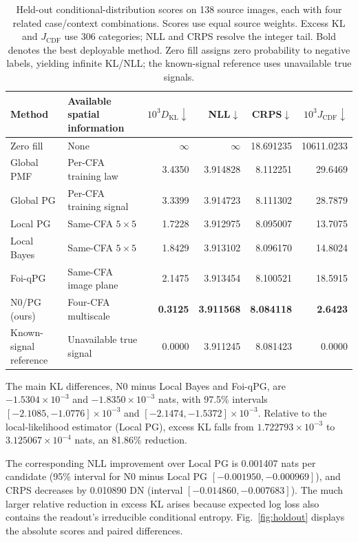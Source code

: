 \documentclass[10pt,twocolumn,journal]{IEEEtran}
\begin{document}
\begin{table}[t]
\centering
\caption{Held-out conditional-distribution scores on 138 source images, each with four related case/context combinations. Scores use equal source weights. Excess KL and $J_{\mathrm{CDF}}$ use 306 categories; NLL and CRPS resolve the integer tail. Bold denotes the best deployable method. Zero fill assigns zero probability to negative labels, yielding infinite KL/NLL; the known-signal reference uses unavailable true signals.}
\label{tab:holdout}
\small
\begin{tabular}{@{}llrrrr@{}}
\toprule
Method & Available spatial information & $10^3D_{\mathrm{KL}}\downarrow$ & NLL$\downarrow$ & CRPS$\downarrow$ & $10^3J_{\mathrm{CDF}}\downarrow$\\
\midrule
Zero fill & None & $\infty$ & $\infty$ & 18.691235 & 10611.0233\\
Global PMF & Per-CFA training law & 3.4350 & 3.914828 & 8.112251 & 29.6469\\
Global PG & Per-CFA training signal & 3.3399 & 3.914723 & 8.111302 & 28.7879\\
Local PG & Same-CFA $5\times5$ & 1.7228 & 3.912975 & 8.095007 & 13.7075\\
Local Bayes & Same-CFA $5\times5$ & 1.8429 & 3.913102 & 8.096170 & 14.8024\\
Foi-qPG & Same-CFA image plane & 2.1475 & 3.913454 & 8.100521 & 18.5915\\
N0/PG (ours) & Four-CFA multiscale & \textbf{0.3125} & \textbf{3.911568} & \textbf{8.084118} & \textbf{2.6423}\\
Known-signal reference & Unavailable true signal & 0.0000 & 3.911245 & 8.081423 & 0.0000\\
\bottomrule
\end{tabular}
\end{table}

The main KL differences, N0 minus Local Bayes and Foi-qPG, are $-1.5304\times10^{-3}$ and $-1.8350\times10^{-3}$ nats, with 97.5\% intervals $[-2.1085,-1.0776]\times10^{-3}$ and $[-2.1474,-1.5372]\times10^{-3}$. Relative to the local-likelihood estimator (Local PG), excess KL falls from $1.722793\times10^{-3}$ to $3.125067\times10^{-4}$ nats, an 81.86\% reduction.



The corresponding NLL improvement over Local PG is 0.001407 nats per candidate (95\% interval for N0 minus Local PG $[-0.001950,-0.000969]$), and CRPS decreases by 0.010890 DN (interval $[-0.014860,-0.007683]$). The much larger relative reduction in excess KL arises because expected log loss also contains the readout's irreducible conditional entropy. Fig.~\ref{fig:holdout} displays the absolute scores and paired differences.
\end{document}
